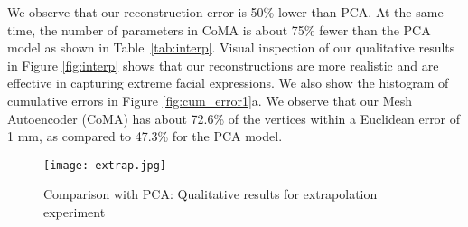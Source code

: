 We observe that our reconstruction error is 50\% lower than PCA. At the same time, the number of parameters in CoMA is about 75\% fewer than the PCA model as shown in Table~\ref{tab:interp}. Visual inspection of our qualitative results in Figure \ref{fig:interp} shows that our reconstructions are more realistic and are effective in capturing extreme facial expressions. We also show the histogram of cumulative errors in Figure \ref{fig:cum_error1}a. We observe that our Mesh Autoencoder (CoMA) has about 72.6\% of the vertices within a Euclidean error of 1 mm, as compared to 47.3\% for the PCA model.



\begin{figure}[h]
\begin{center}
\texttt{[image: extrap.jpg]}
\end{center}
\caption{Comparison with PCA: Qualitative results for extrapolation experiment}
\label{fig:extrap}
\end{figure}

